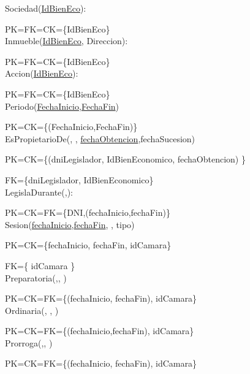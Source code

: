 Sociedad(\underline{IdBienEco}):

PK=FK=CK={\{IdBienEco}\}\\

Inmueble(\underline{IdBienEco}, Direccion):

PK=FK=CK={\{IdBienEco}\}\\

Accion(\underline{IdBienEco}):

PK=FK=CK={\{IdBienEco}\}\\

Periodo(\underline{FechaInicio},\underline{FechaFin})

PK=CK={\{(FechaInicio,FechaFin)}\}\\

EsPropietarioDe(\underline{}, \underline{}, \underline{fechaObtencion},fechaSucesion)

PK=CK={\{(dniLegislador, IdBienEconomico, fechaObtencion) }\}

FK={\{dniLegislador, IdBienEconomico}\}\\

LegislaDurante(\underline{},\underline{}):

PK=CK=FK={\{DNI,(fechaInicio,fechaFin)}\}\\

Sesion(\underline{fechaInicio},\underline{fechaFin}, \underline{}, tipo)

PK=CK={\{fechaInicio, fechaFin, idCamara}\}

FK={\{ idCamara }\} \\

Preparatoria(\underline{},\underline{}, \underline{})

PK=CK=FK={\{(fechaInicio, fechaFin), idCamara}\}\\

Ordinaria(\underline{}, \underline{}, \underline{})

PK=CK=FK={\{(fechaInicio,fechaFin), idCamara}\}\\

Prorroga(\underline{},\underline{}, \underline{})

PK=CK=FK={\{(fechaInicio, fechaFin), idCamara}\}\\

